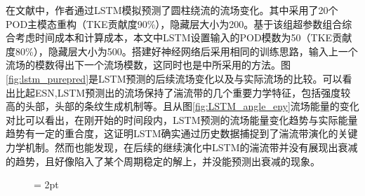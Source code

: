 在文献\cite{lstmmodes}中，作者通过LSTM模拟预测了圆柱绕流的流场变化。其中采用了20个POD主模态重构（TKE贡献度90\%），隐藏层大小为200。基于该组超参数组合综合考虑时间成本和计算成本，本文中LSTM设置输入的POD模数为50（TKE贡献度80\%），隐藏层大小为500。搭建好神经网络后采用相同的训练思路，输入上一个流场的模数得出下一个流场模数，这同时也是\cite{Pandey2020}中所采用的方法。图\ref{fig:lstm_purepred}是LSTM预测的后续流场变化以及与实际流场的比较。可以看出比起ESN,LSTM预测出的流场保持了湍流带的几个重要力学特征，包括强度较高的头部，头部的条纹生成机制等。且从图\ref{fig:LSTM_angle_eny}流场能量的变化对比可以看出，在刚开始的时间段内，LSTM预测的流场能量变化趋势与实际能量趋势有一定的重合度，这证明LSTM确实通过历史数据捕捉到了湍流带演化的关键力学机制。然而也能发现，在后续的继续演化中LSTM的湍流带并没有展现出衰减的趋势，且好像陷入了某个周期稳定的解上，并没能预测出衰减的现象。
\begin{figure}[H]
	\subfigbottomskip = 2pt
	\begin{minipage}[h]{0.24\linewidth}
	\centering
	\end{minipage}
	\begin{minipage}[h]{0.24\linewidth}
	\centering
	\end{minipage}
	\begin{minipage}[h]{0.24\linewidth}
	\centering
	\end{minipage}
	\begin{minipage}[h]{0.24\linewidth}
	\centering
	\end{minipage}
	

\end{figure}
